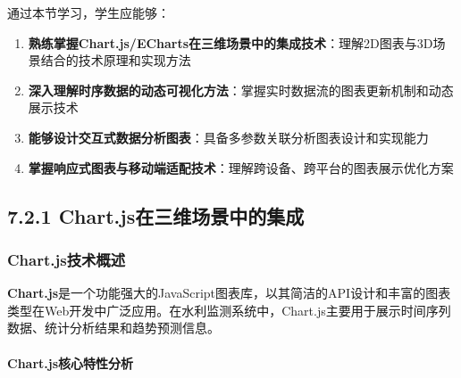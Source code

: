 通过本节学习，学生应能够：

\begin{enumerate}
\def\labelenumi{\arabic{enumi}.}
\tightlist
\item
  \textbf{熟练掌握Chart.js/ECharts在三维场景中的集成技术}：理解2D图表与3D场景结合的技术原理和实现方法
\item
  \textbf{深入理解时序数据的动态可视化方法}：掌握实时数据流的图表更新机制和动态展示技术
\item
  \textbf{能够设计交互式数据分析图表}：具备多参数关联分析图表设计和实现能力
\item
  \textbf{掌握响应式图表与移动端适配技术}：理解跨设备、跨平台的图表展示优化方案
\end{enumerate}

\subsection{7.2.1 Chart.js在三维场景中的集成}\label{chart.jsux5728ux4e09ux7ef4ux573aux666fux4e2dux7684ux96c6ux6210}

\subsubsection{Chart.js技术概述}\label{chart.jsux6280ux672fux6982ux8ff0}

\textbf{Chart.js}是一个功能强大的JavaScript图表库，以其简洁的API设计和丰富的图表类型在Web开发中广泛应用。在水利监测系统中，Chart.js主要用于展示时间序列数据、统计分析结果和趋势预测信息。

\paragraph{Chart.js核心特性分析}\label{chart.jsux6838ux5fc3ux7279ux6027ux5206ux6790}

